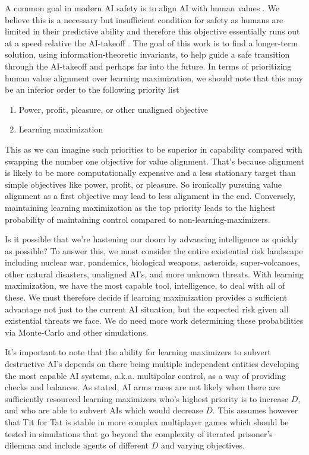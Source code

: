 \documentclass{article}
\begin{document}
A common goal in modern AI safety is to align AI with human values \cite{bostrom-values}. We believe this is a necessary but insufficient condition for safety as humans are limited in their predictive ability and therefore this objective essentially runs out at a speed relative the AI-takeoff \cite{bostrom-takeoff}. The goal of this work is to find a longer-term solution, using information-theoretic invariants, to help guide a safe transition through the AI-takeoff and perhaps far into the future. In terms of prioritizing human value alignment over learning maximization, we should note that this may be an inferior order to the following priority list
\begin{enumerate}
    \item Power, profit, pleasure, or other unaligned objective
    \item Learning maximization
\end{enumerate}
This as we can imagine such priorities to be superior in capability compared with swapping the number one objective for value alignment. That's because alignment is likely to be more computationally expensive and a less stationary target than simple objectives like power, profit, or pleasure. So ironically pursuing value alignment as a first objective may lead to less alignment in the end. Conversely, maintaining learning maximization as the top priority leads to the highest probability of maintaining control compared to non-learning-maximizers.

Is it possible that we're hastening our doom by advancing intelligence as quickly as possible?
To answer this, we must consider the entire existential risk landscape including nuclear war\cite{wiki-nuclear-accidents}, pandemics, biological weapons, asteroids, super-volcanoes, other natural disasters, unaligned AI's, and more unknown threats. With learning maximization, we have the most capable tool, intelligence, to deal with all of these. We must therefore decide if learning maximization provides a sufficient advantage not just to the current AI situation, but the expected risk given all existential threats we face\cite{wiki-total-expectation}. We do need more work determining these probabilities via Monte-Carlo \cite{game-of-agi} and other simulations.

It's important to note that the ability for learning maximizers to subvert destructive AI's depends on there being multiple independent entities developing the most capable AI systems, a.k.a. multipolar control, as a way of providing checks and balances. As stated, AI arms races are not likely when there are sufficiently resourced learning maximizers who's highest priority is to increase $D$, and who are able to subvert AIs which would decrease $D$. This assumes however that Tit for Tat\cite{axelrod1988further} is stable in more complex multiplayer games which should be tested in simulations that go beyond the complexity of iterated prisoner's dilemma \cite{fogel1993evolving} and include agents of different $D$ and varying objectives.
\end{document}
